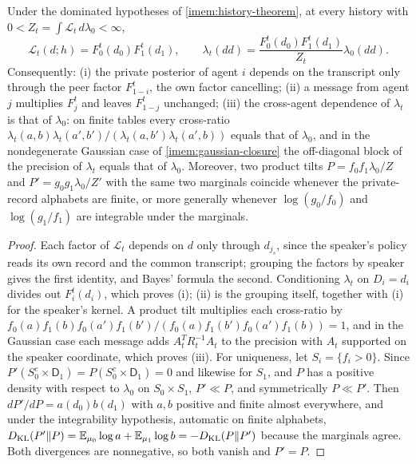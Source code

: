 Under the dominated hypotheses of \cref{imem:history-theorem}, at every history with $0<Z_t=\int\mathcal L_t\,d\lambda_0<\infty$,
\begin{equation}
 \mathcal L_t(d;h)=F_0^t(d_0)F_1^t(d_1),\qquad
 \lambda_t(dd)=\frac{F_0^t(d_0)F_1^t(d_1)}{Z_t}\lambda_0(dd).
 \label{imem:product-tilt-formula}
\end{equation}
Consequently: (i) the private posterior of agent $i$ depends on the transcript only through the peer factor $F_{1-i}^t$, the own factor cancelling; (ii) a message from agent $j$ multiplies $F_j^t$ and leaves $F_{1-j}^t$ unchanged; (iii) the cross-agent dependence of $\lambda_t$ is that of $\lambda_0$: on finite tables every cross-ratio $\lambda_t(a,b)\lambda_t(a',b')/(\lambda_t(a,b')\lambda_t(a',b))$ equals that of $\lambda_0$, and in the nondegenerate Gaussian case of \cref{imem:gaussian-closure} the off-diagonal block of the precision of $\lambda_t$ equals that of $\lambda_0$. Moreover, two product tilts $P=f_0f_1\lambda_0/Z$ and $P'=g_0g_1\lambda_0/Z'$ with the same two marginals coincide whenever the private-record alphabets are finite, or more generally whenever $\log(g_0/f_0)$ and $\log(g_1/f_1)$ are integrable under the marginals.
\begin{proof}
Each factor of $\mathcal L_t$ depends on $d$ only through $d_{j_s}$, since the speaker's policy reads its own record and the common transcript; grouping the factors by speaker gives the first identity, and Bayes' formula the second. Conditioning $\lambda_t$ on $D_i=d_i$ divides out $F_i^t(d_i)$, which proves (i); (ii) is the grouping itself, together with (i) for the speaker's kernel. A product tilt multiplies each cross-ratio by $f_0(a)f_1(b)f_0(a')f_1(b')/(f_0(a)f_1(b')f_0(a')f_1(b))=1$, and in the Gaussian case each message adds $A_t^TR_t^{-1}A_t$ to the precision with $A_t$ supported on the speaker coordinate, which proves (iii). For uniqueness, let $S_i=\{f_i>0\}$. Since $P'(S_0^c\times\mathsf D_1)=P(S_0^c\times\mathsf D_1)=0$ and likewise for $S_1$, and $P$ has a positive density with respect to $\lambda_0$ on $S_0\times S_1$, $P'\ll P$, and symmetrically $P\ll P'$. Then $dP'/dP=a(d_0)b(d_1)$ with $a,b$ positive and finite almost everywhere, and under the integrability hypothesis, automatic on finite alphabets, $D_{\mathrm{KL}}(P'\Vert P)=\mathbb E_{\mu_0}\log a+\mathbb E_{\mu_1}\log b=-D_{\mathrm{KL}}(P\Vert P')$ because the marginals agree. Both divergences are nonnegative, so both vanish and $P'=P$.
\end{proof}

